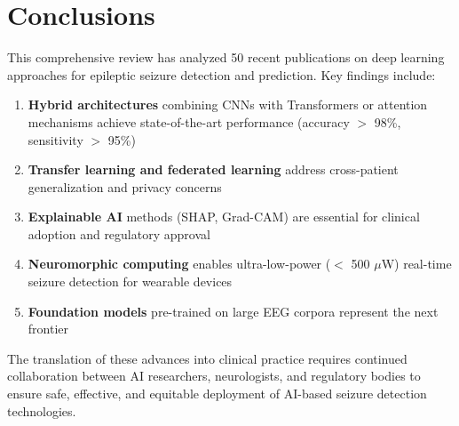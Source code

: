 \documentclass[12pt,a4paper]{article}
\begin{document}
\section{Conclusions}

This comprehensive review has analyzed 50 recent publications on deep learning approaches for epileptic seizure detection and prediction. Key findings include:

\begin{tcolorbox}[colback=primaryblue!5, colframe=primaryblue, title=Key Takeaways]
\begin{enumerate}
    \item \textbf{Hybrid architectures} combining CNNs with Transformers or attention mechanisms achieve state-of-the-art performance (accuracy $>$ 98\%, sensitivity $>$ 95\%)
    \item \textbf{Transfer learning and federated learning} address cross-patient generalization and privacy concerns
    \item \textbf{Explainable AI} methods (SHAP, Grad-CAM) are essential for clinical adoption and regulatory approval
    \item \textbf{Neuromorphic computing} enables ultra-low-power ($<$ 500 $\mu$W) real-time seizure detection for wearable devices
    \item \textbf{Foundation models} pre-trained on large EEG corpora represent the next frontier
\end{enumerate}
\end{tcolorbox}

The translation of these advances into clinical practice requires continued collaboration between AI researchers, neurologists, and regulatory bodies to ensure safe, effective, and equitable deployment of AI-based seizure detection technologies.

\newpage


\end{document}
